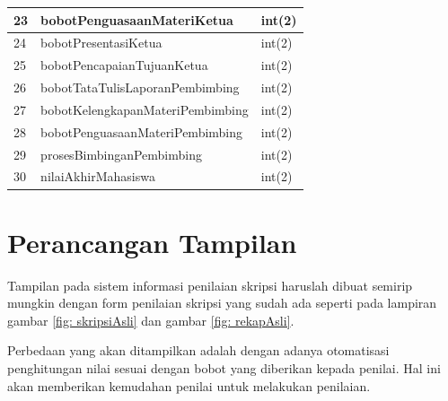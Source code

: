 \begin{table}[H]
\begin{tabular}{| m{0.75cm} | m{7cm} | m{3cm} |}
		23 & bobotPenguasaanMateriKetua & int(2)\\
		\hline
		24 & bobotPresentasiKetua & int(2)\\
		\hline
		25 & bobotPencapaianTujuanKetua & int(2)\\
		\hline
		26 & bobotTataTulisLaporanPembimbing & int(2)\\
		\hline
		27 & bobotKelengkapanMateriPembimbing & int(2)\\
		\hline
		28 & bobotPenguasaanMateriPembimbing & int(2)\\
		\hline
		29 & prosesBimbinganPembimbing & int(2)\\
		\hline
		30 & nilaiAkhirMahasiswa & int(2)\\
		\hline
		\end{tabular}
	\end{table}
	
	\section{Perancangan Tampilan}
	\label{sec: perancanganTampilan}
	
	Tampilan pada sistem informasi penilaian skripsi haruslah dibuat semirip mungkin dengan form penilaian skripsi yang sudah ada seperti pada lampiran gambar \ref{fig: skripsiAsli} dan gambar \ref{fig: rekapAsli}.
	
	Perbedaan yang akan ditampilkan adalah dengan adanya otomatisasi penghitungan nilai sesuai dengan bobot yang diberikan kepada penilai. Hal ini akan memberikan kemudahan penilai untuk melakukan penilaian.
	
